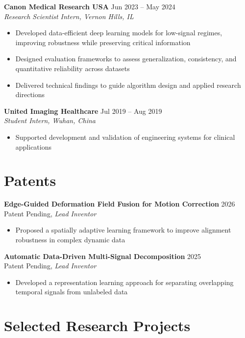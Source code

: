 \textbf{Canon Medical Research USA} \hfill Jun 2023 -- May 2024 \\
\textit{Research Scientist Intern, Vernon Hills, IL}
\begin{itemize}[leftmargin=*]
\item Developed data-efficient deep learning models for low-signal regimes, improving robustness while preserving critical information
\item Designed evaluation frameworks to assess generalization, consistency, and quantitative reliability across datasets
\item Delivered technical findings to guide algorithm design and applied research directions
\end{itemize}

\textbf{United Imaging Healthcare} \hfill Jul 2019 -- Aug 2019 \\
\textit{Student Intern, Wuhan, China}
\begin{itemize}[leftmargin=*]
\item Supported development and validation of engineering systems for clinical applications
\end{itemize}

\section{Patents}
\textbf{Edge-Guided Deformation Field Fusion for Motion Correction} \hfill 2026 \\
Patent Pending, \textit{Lead Inventor}
\begin{itemize}[leftmargin=*]
\item Proposed a spatially adaptive learning framework to improve alignment robustness in complex dynamic data
\end{itemize}

\textbf{Automatic Data-Driven Multi-Signal Decomposition} \hfill 2025 \\
Patent Pending, \textit{Lead Inventor}
\begin{itemize}[leftmargin=*]
\item Developed a representation learning approach for separating overlapping temporal signals from unlabeled data
\end{itemize}

\section{Selected Research Projects}

